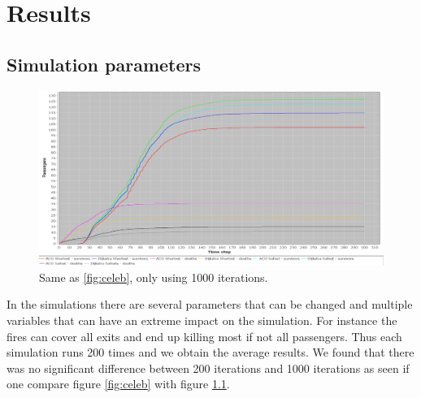 \chapter{Results}
\label{ch:testing}

\section{Simulation parameters}

\begin{figure} [h]
\centering
\hspace*{-1.0in}
\includegraphics[scale=0.35]{images/Graph-using-1000-rounds-140-passangers.png}
\caption{Same as \ref{fig:celeb}, only using 1000 iterations.}
\label{fig:celeb1000}
\end{figure}

In the simulations there are several parameters that can be changed and multiple variables that can have an extreme impact on the simulation. For instance the fires can cover all exits and end up killing most if not all passengers. Thus each simulation runs 200 times and we obtain the average results. We found that there was no significant difference between 200 iterations and 1000 iterations as seen if one compare figure \ref{fig:celeb} with figure \ref{fig:celeb1000}.

